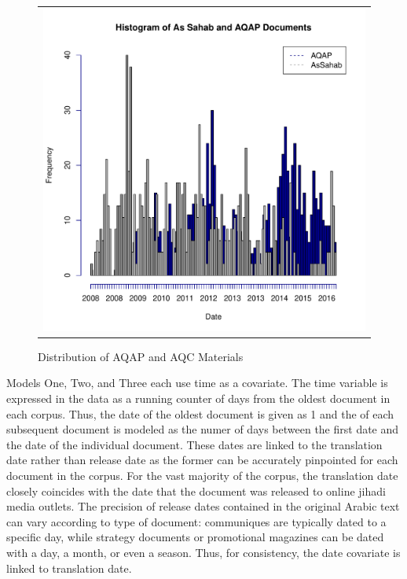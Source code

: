 \begin{figure}
\begin{center}
  \begin{tabular}{c}
    \includegraphics[width=5.00in]{./Pictures/histofAQAPandAS.pdf}
  \end{tabular}
  \caption{Distribution of AQAP and AQC Materials}
  \label{fig:hist}
\end{center}
\end{figure}

Models One, Two, and Three each use time as a covariate. The time
variable is expressed in the data as a running counter of days from
the oldest document in each corpus. Thus, the date of the oldest
document is given as 1 and the  of each subsequent document is
modeled as the numer of days between the first date and the date of
the individual document. These dates are linked to the                                                           
  translation date rather than release date as the former can be                                            
  accurately pinpointed for each document in the corpus. For the vast                                       
  majority of the corpus, the translation date closely coincides with                                       
  the date that the document was released to online jihadi media outlets. The precision                     
  of release dates contained in the original Arabic text can vary                                           
  according to type of document: communiques are typically dated                                            
  to a specific day, while strategy documents or promotional magazines                                      
  can be dated with a day, a month, or even a season. Thus, for                                             
  consistency, the date covariate is linked to translation date.

